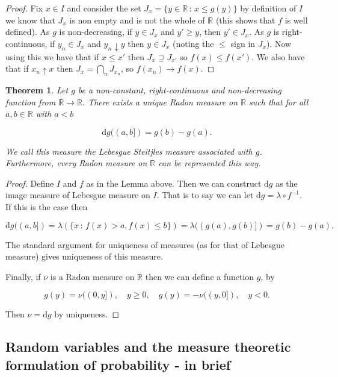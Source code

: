 \documentclass[
]{book}
\newtheorem{theorem}{Theorem}[chapter]
\theoremstyle{definition}
\theoremstyle{definition}
\theoremstyle{definition}
\theoremstyle{definition}
\theoremstyle{remark}
\begin{document}
\begin{proof}
Fix \(x \in I\) and consider the set \(J_x = \{ y \in \mathbb{R}\,:\, x \leq g(y)\}\) by definition of \(I\) we know that \(J_x\) is non empty and is not the whole of \(\mathbb{R}\) (this shows that \(f\) is well defined). As \(g\) is non-decreasing, if \(y \in J_x\) and \(y' \geq y\), then \(y' \in J_x\). As \(g\) is right-continuous, if \(y_n \in J_x\) and \(y_n \downarrow y\) then \(y \in J_x\) (noting the \(\leq\) sign in \(J_x\)). Now using this we have that if \(x \leq x'\) then \(J_x \supseteq J_{x'}\) so \(f(x) \leq f(x')\). We also have that if \(x_n \uparrow x\) then \(J_x = \bigcap_n J_{x_n}\), so \(f(x_n) \rightarrow f(x)\).
\end{proof}

\begin{theorem}
Let \(g\) be a non-constant, right-continuous and non-decreasing function from \(\mathbb{R} \rightarrow \mathbb{R}\). There exists a unique Radon measure on \(\mathbb{R}\) such that for all \(a,b \in \mathbb{R}\) with \(a < b\)

\[ \mathrm{d}g((a,b]) = g(b) - g(a). \]

We call this measure the \emph{Lebesgue Steitjles} measure associated with \(g\). Furthermore, every Radon measure on \(\mathbb{R}\) can be represented this way.
\end{theorem}

\begin{proof}
Define \(I\) and \(f\) as in the Lemma above. Then we can construct \(\mathrm{d}g\) as the image measure of Lebesgue measure on \(I\). That is to say we can let \(\mathrm{d}g = \lambda \circ f^{-1}\). If this is the case then

\[ \mathrm{d}g ((a,b]) = \lambda \left(\{ x \, :\, f(x) > a, f(x) \leq b \} \right) = \lambda ((g(a), g(b)]) = g(b) - g(a). \]

The standard argument for uniqueness of measures (as for that of Lebesgue measure) gives uniqueness of this measure.

Finally, if \(\nu\) is a Radon measure on \(\mathbb{R}\) then we can define a function \(g\), by

\[ g(y) = \nu((0,y]), \quad y \geq 0, \quad g(y) = -\nu((y,0]), \quad y<0. \]

Then \(\nu = \mathrm{d}g\) by uniqueness.
\end{proof}

\hypertarget{random-variables-and-the-measure-theoretic-formulation-of-probability---in-brief}{%
\subsection{Random variables and the measure theoretic formulation of probability - in brief}\label{random-variables-and-the-measure-theoretic-formulation-of-probability---in-brief}}
\end{document}
